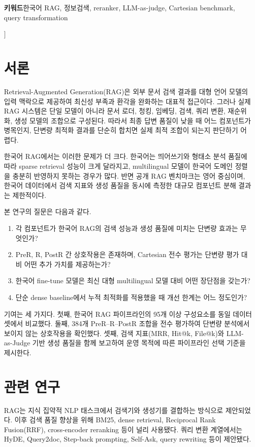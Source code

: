 \documentclass[10pt,a4paper,twocolumn]{article}
\begin{document}
\begin{@twocolumnfalse}
{\vspace{1mm}
\noindent\textbf{키워드}\quad 한국어 RAG, 정보검색, reranker, LLM-as-judge, Cartesian benchmark, query transformation\par
}\vspace{5mm}
\end{@twocolumnfalse}
]
\makeatother

\section{서론}
Retrieval-Augmented Generation(RAG)은 외부 문서 검색 결과를 대형 언어 모델의 입력 맥락으로 제공하여 최신성 부족과 환각을 완화하는 대표적 접근이다\cite{lewis2020rag}. 그러나 실제 RAG 시스템은 단일 모델이 아니라 문서 로더, 청킹, 임베딩, 검색, 쿼리 변환, 재순위화, 생성 모델의 조합으로 구성된다. 따라서 최종 답변 품질이 낮을 때 어느 컴포넌트가 병목인지, 단변량 최적화 결과를 단순히 합치면 실제 최적 조합이 되는지 판단하기 어렵다.

한국어 RAG에서는 이러한 문제가 더 크다. 한국어는 띄어쓰기와 형태소 분석 품질에 따라 sparse retrieval 성능이 크게 달라지고, multilingual 모델이 한국어 도메인 정렬을 충분히 반영하지 못하는 경우가 많다. 반면 공개 RAG 벤치마크는 영어 중심이며, 한국어 데이터에서 검색 지표와 생성 품질을 동시에 측정한 대규모 컴포넌트 분해 결과는 제한적이다.

본 연구의 질문은 다음과 같다.
\begin{enumerate}
  \item 각 컴포넌트가 한국어 RAG의 검색 성능과 생성 품질에 미치는 단변량 효과는 무엇인가?
  \item PreR, R, PostR 간 상호작용은 존재하며, Cartesian 전수 평가는 단변량 평가 대비 어떤 추가 가치를 제공하는가?
  \item 한국어 fine-tune 모델은 최신 대형 multilingual 모델 대비 어떤 장단점을 갖는가?
  \item 단순 dense baseline에서 누적 최적화를 적용했을 때 개선 한계는 어느 정도인가?
\end{enumerate}

기여는 세 가지다. 첫째, 한국어 RAG 파이프라인의 95개 이상 구성요소를 동일 데이터셋에서 비교했다. 둘째, 384개 PreR--R--PostR 조합을 전수 평가하여 단변량 분석에서 보이지 않는 상호작용을 확인했다. 셋째, 검색 지표(MRR, Hit@k, File@k)와 LLM-as-Judge 기반 생성 품질을 함께 보고하여 운영 목적에 따른 파이프라인 선택 기준을 제시한다.

\section{관련 연구}
RAG는 지식 집약적 NLP 태스크에서 검색기와 생성기를 결합하는 방식으로 제안되었다\cite{lewis2020rag}. 이후 검색 품질 향상을 위해 BM25\cite{robertson2009bm25}, dense retrieval, Reciprocal Rank Fusion(RRF)\cite{cormack2009rrf}, cross-encoder reranking 등이 널리 사용됐다. 쿼리 변환 계열에서는 HyDE\cite{gao2023hyde}, Query2doc\cite{wang2023query2doc}, Step-back prompting\cite{zheng2024stepback}, Self-Ask\cite{press2023selfask}, query rewriting\cite{ma2023query} 등이 제안됐다.
\end{document}
